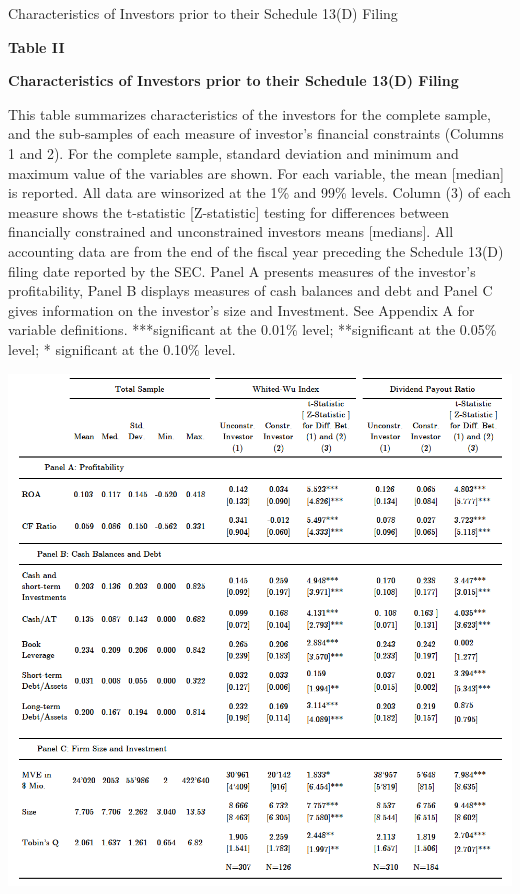\documentclass[12pt]{article}
\begin{document}
\begin{table}[!htbp]
	\centering
	\captionsetup{textformat=empty,labelformat=blank}
	\caption{Characteristics of Investors prior to their Schedule 13(D) Filing}
	\textbf{Table II}\par\medskip
	\large\textbf{Characteristics of Investors prior to their Schedule 13(D) Filing}\par\medskip
	\justifying
	\footnotesize\noindent{}This table summarizes characteristics of the investors for the complete sample, and the sub-samples of each measure of investor's financial constraints (Columns 1 and 2). For the complete sample, standard deviation and minimum and maximum value of the variables are shown. For each variable, the mean [median] is reported. All data are winsorized at the 1\% and 99\% levels. Column (3) of each measure shows the t-statistic [Z-statistic] testing for differences between financially constrained and unconstrained investors means [medians]. All accounting data are from the end of the fiscal year preceding the Schedule 13(D) filing date reported by the SEC. Panel A presents measures of the investor's profitability, Panel B displays  measures of cash balances and debt and Panel C gives information on the investor's size and Investment. See Appendix A for variable definitions. ***significant at the 0.01\% level; **significant at the 0.05\% level; * significant at the 0.10\% level.\par\medskip
	\centering													
	\begin{adjustbox}{width=\textwidth}
		\includegraphics{summary1final}
	\end{adjustbox}\par\medskip
\end{table}
\end{document}
